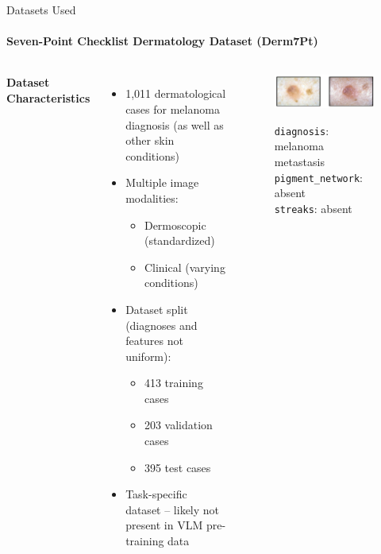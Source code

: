\documentclass[aspectratio=169]{beamer}
\newcommand\customcolumnwidth{0.4625\textwidth}
\begin{document}
\begin{frame}{Datasets Used}
\framesubtitle{Seven-Point Checklist Dermatology Dataset (Derm7Pt)}
\vspace{-1em}
  \begin{columns}[T]
    \column{\customcolumnwidth}
      \textbf{Dataset Characteristics}
      \vspace{-0.4em}
      \begin{itemize}
        \item 1,011 dermatological cases for melanoma diagnosis (as well as other skin conditions)
        \item Multiple image modalities:
          \begin{itemize}
            \item Dermoscopic (standardized)
            \item Clinical (varying conditions)
          \end{itemize}
        \item Dataset split (diagnoses and features not uniform):
          \begin{itemize}
            \item 413 training cases
            \item 203 validation cases
            \item 395 test cases
          \end{itemize}
        \item Task-specific dataset -- likely not present in VLM pre-training data
      \end{itemize}
    \column{\customcolumnwidth}
      \vspace{-0.5em}
      \begin{figure}[h]
        \centering
        \includegraphics[width=0.9\linewidth]{figures/derm7pt-images/derm_02.png}
        \vspace{0.25em}
        \raggedright
        \scriptsize\texttt{diagnosis}: melanoma metastasis\\
        \scriptsize\texttt{pigment\_network}: absent\\
        \scriptsize\texttt{streaks}: absent\\

\end{figure}
\end{columns}
\end{frame}
\end{document}
